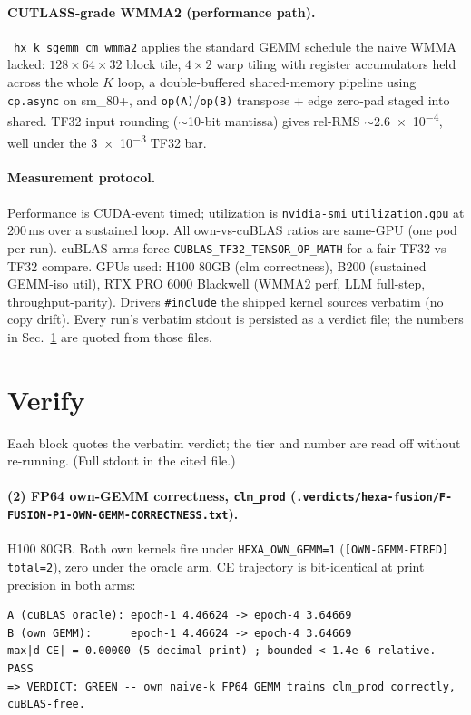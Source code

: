 \documentclass[11pt,a4paper]{article}
\newcommand{\vd}[1]{\texttt{.verdicts/hexa-fusion/#1.txt}}
\begin{document}
\paragraph{CUTLASS-grade WMMA2 (performance path).}
\texttt{\_hx\_k\_sgemm\_cm\_wmma2} applies the standard GEMM schedule the naive
WMMA lacked: $128\times64\times32$ block tile, $4\times2$ warp tiling with
register accumulators held across the whole $K$ loop, a double-buffered
shared-memory pipeline using \texttt{cp.async} on sm\_80+, and \texttt{op(A)}/\texttt{op(B)}
transpose + edge zero-pad staged into shared. TF32 input rounding ($\sim$10-bit
mantissa) gives rel-RMS $\sim$\SI{2.6e-4}{}, well under the \SI{3e-3}{} TF32 bar.

\paragraph{Measurement protocol.}
Performance is CUDA-event timed; utilization is \texttt{nvidia-smi}
\texttt{utilization.gpu} at 200\,ms over a sustained loop. All own-vs-cuBLAS
ratios are same-GPU (one pod per run). cuBLAS arms force
\texttt{CUBLAS\_TF32\_TENSOR\_OP\_MATH} for a fair TF32-vs-TF32 compare. GPUs used:
H100 80GB (clm correctness), B200 (sustained GEMM-iso util), RTX PRO 6000
Blackwell (WMMA2 perf, LLM full-step, throughput-parity). Drivers
\texttt{\#include} the shipped kernel sources verbatim (no copy drift). Every
run's verbatim stdout is persisted as a verdict file; the numbers in
Sec.~\ref{sec:verify} are quoted from those files.

\section{Verify}
\label{sec:verify}

Each block quotes the verbatim verdict; the tier and number are read off without
re-running. (Full stdout in the cited file.)

\paragraph{(2) FP64 own-GEMM correctness, \texttt{clm\_prod}
(\vd{F-FUSION-P1-OWN-GEMM-CORRECTNESS}).}
H100 80GB. Both own kernels fire under \texttt{HEXA\_OWN\_GEMM=1}
(\texttt{[OWN-GEMM-FIRED] total=2}), zero under the oracle arm. CE trajectory is
bit-identical at print precision in both arms:
\begin{lstlisting}[basicstyle=\ttfamily\footnotesize,frame=single,xleftmargin=0pt]
A (cuBLAS oracle): epoch-1 4.46624 -> epoch-4 3.64669
B (own GEMM):      epoch-1 4.46624 -> epoch-4 3.64669
max|d CE| = 0.00000 (5-decimal print) ; bounded < 1.4e-6 relative.  PASS
=> VERDICT: GREEN -- own naive-k FP64 GEMM trains clm_prod correctly, cuBLAS-free.
\end{lstlisting}
\end{document}
